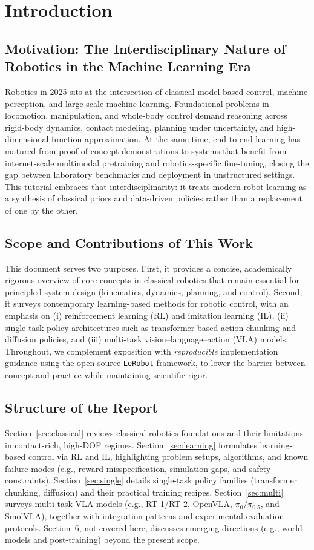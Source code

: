 \section{Introduction}

\subsection{Motivation: The Interdisciplinary Nature of Robotics in the Machine Learning Era}
Robotics in 2025 sits at the intersection of classical model-based control, machine perception, and large-scale machine learning. Foundational problems in locomotion, manipulation, and whole-body control demand reasoning across rigid-body dynamics, contact modeling, planning under uncertainty, and high-dimensional function approximation. At the same time, end-to-end learning has matured from proof-of-concept demonstrations to systems that benefit from internet-scale multimodal pretraining and robotics-specific fine-tuning, closing the gap between laboratory benchmarks and deployment in unstructured settings. This tutorial embraces that interdisciplinarity: it treats modern robot learning as a synthesis of classical priors and data-driven policies rather than a replacement of one by the other.

\subsection{Scope and Contributions of This Work}
This document serves two purposes. First, it provides a concise, academically rigorous overview of core concepts in classical robotics that remain essential for principled system design (kinematics, dynamics, planning, and control). Second, it surveys contemporary learning-based methods for robotic control, with an emphasis on (i) reinforcement learning (RL) and imitation learning (IL), (ii) single-task policy architectures such as transformer-based action chunking and diffusion policies, and (iii) multi-task vision–language–action (VLA) models. Throughout, we complement exposition with \emph{reproducible} implementation guidance using the open-source \texttt{LeRobot} framework, to lower the barrier between concept and practice while maintaining scientific rigor.

\subsection{Structure of the Report}
Section~\ref{sec:classical} reviews classical robotics foundations and their limitations in contact-rich, high-DOF regimes. Section~\ref{sec:learning} formulates learning-based control via RL and IL, highlighting problem setups, algorithms, and known failure modes (e.g., reward misspecification, simulation gaps, and safety constraints). Section~\ref{sec:single} details single-task policy families (transformer chunking, diffusion) and their practical training recipes. Section~\ref{sec:multi} surveys multi-task VLA models (e.g., RT-1/RT-2, OpenVLA, $\pi_0/\pi_{0.5}$, and SmolVLA), together with integration patterns and experimental evaluation protocols. Section~6, not covered here, discusses emerging directions (e.g., world models and post-training) beyond the present scope.